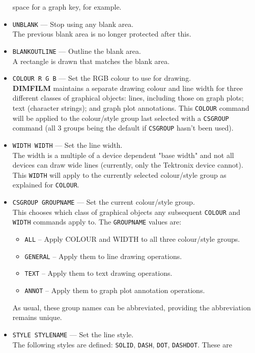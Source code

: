 \documentclass[a4paper,twoside,11pt]{article}
\newcommand{\textttc}[1]{\texttt{\textcolor{OurRed}{#1}}}
\begin{document}
\begin{itemize}
   space for a graph key, for example.
\item \textttc{UNBLANK} --- Stop using any blank area.\\
   The previous blank area is no longer protected after this.
\item \textttc{BLANKOUTLINE} --- Outline the blank area.\\
   A rectangle is drawn that matches the blank area.
\item \textttc{COLOUR R G B} --- Set the RGB colour to use for drawing.\\
   \textbf{DIMFILM} maintains a separate drawing colour and line width for three
   different classes of graphical objects: lines, including those on graph plots;
   text (character strings); and graph plot annotations. This \texttt{COLOUR}
   command will be applied to the colour/style group last selected with
   a \texttt{CSGROUP} command (all 3 groups being the default if \texttt{CSGROUP} hasn't
   been used).
\item \textttc{WIDTH WIDTH} --- Set the line width.\\
   The width is a multiple of a device dependent "base width" and not all devices
   can draw wide lines (currently, only the Tektronix device cannot). This \texttt{WIDTH} will
   apply to the currently selected colour/style group as explained for \texttt{COLOUR}.
\item \textttc{CSGROUP GROUPNAME} --- Set the current colour/style group.\\
	This chooses which class of graphical objects any subsequent \texttt{COLOUR} and \texttt{WIDTH}
	commands apply to. The \texttt{GROUPNAME} values are: 
	\begin{itemize}
	\item \textttc{ALL} -- Apply COLOUR and WIDTH to all three colour/style groups.
	\item \textttc{GENERAL} -- Apply them to line drawing operations.
	\item \textttc{TEXT} -- Apply them to text drawing operations.
	\item \textttc{ANNOT} -- Apply them to graph plot annotation operations.
	\end{itemize}
	As usual, these group names can be abbreviated, providing the abbreviation
	remains unique.
\item \textttc{STYLE STYLENAME} --- Set the line style.\\
   The following styles are defined: \texttt{SOLID}, \texttt{DASH},
   \texttt{DOT}, \texttt{DASHDOT}. These are

\end{itemize}
\end{document}
